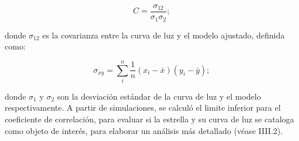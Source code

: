 \begin{equation}
\displaystyle C=\frac{\sigma_{12}}{\sigma_{1}\sigma_{2}};
\end{equation}
  
donde $\sigma_{12}$ es la covarianza entre la curva de luz y el modelo ajustado, definida como:
  
\begin{equation}
\displaystyle \sigma_{xy}= \sum\limits_{i}^{n} \frac{1}{n}(x_{i}-\bar{x})(y_{i}-\bar{y});
\end{equation}
  
donde $\sigma_{1}$ y $\sigma_{2}$ son la desviación estándar de la curva de luz y el modelo respectivamente. A partir de simulaciones, se calculó el limite inferior para el coeficiente de correlación, para evaluar si la estrella y su curva de luz se cataloga como objeto de interés, para elaborar un análisis más detallado (véase IIII.2).